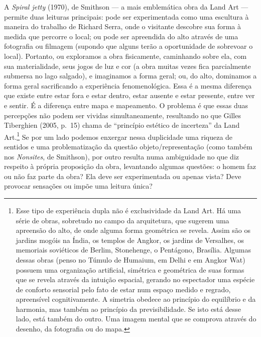 A \emph{Spiral jetty} (1970), de Smithson --- a mais emblemática obra da
Land Art --- permite duas leituras principais: pode ser experimentada
como uma escultura à maneira do trabalho de Richard Serra, onde o
visitante descobre sua forma à medida que percorre o local; ou pode ser
apreendida do alto através de uma fotografia ou filmagem (supondo que
alguns terão a oportunidade de sobrevoar o local). Portanto, ou
exploramos a obra fisicamente, caminhando sobre ela, com sua
materialidade, seus jogos de luz e cor (a obra muitas vezes fica
parcialmente submersa no lago salgado), e imaginamos a forma geral; ou,
do alto, dominamos a forma geral sacrificando a experiência
fenomenológica. Essa é a mesma diferença que existe entre estar fora e
estar dentro, estar ausente e estar presente, entre ver e sentir. É a
diferença entre mapa e mapeamento. O problema é que essas duas
percepções não podem ser vividas simultaneamente, resultando no que
Gilles Tiberghien (2005, p.~15) chama de ``princípio estético de
incerteza'' da Land Art.\footnote{Esse tipo de experiência dupla não é
  exclusividade da Land Art. Há uma série de obras, sobretudo no campo
  da arquitetura, que sugerem uma apreensão do alto, de onde alguma
  forma geométrica se revela. Assim são os jardins mogóis na Índia, os
  templos de Angkor, os jardins de Versalhes, os memoriais soviéticos de
  Berlim, Stonehenge, o Pentágono, Brasília. Algumas dessas obras (penso
  no Túmulo de Humaium, em Delhi e em Angkor Wat) possuem uma
  organização artificial, simétrica e geométrica de suas formas que se
  revela através da intuição espacial, gerando no espectador uma espécie
  de conforto sensorial pelo fato de estar num espaço medido e regrado,
  apreensível cognitivamente. A simetria obedece ao princípio do
  equilíbrio e da harmonia, mas também ao princípio da previsibilidade.
  Se isto está desse lado, está também do outro. Uma imagem mental que
  se comprova através do desenho, da fotografia ou do mapa.} Se por um
lado podemos enxergar nessa duplicidade uma riqueza de sentidos e uma
problematização da questão objeto/representação (como também nos
\emph{Nonsites}, de Smithson), por outro resulta numa ambiguidade no que
diz respeito à própria proposição da obra, levantando algumas questões:
o homem faz ou não faz parte da obra? Ela deve ser experimentada ou
apenas vista? Deve provocar sensações ou impõe uma leitura única?

